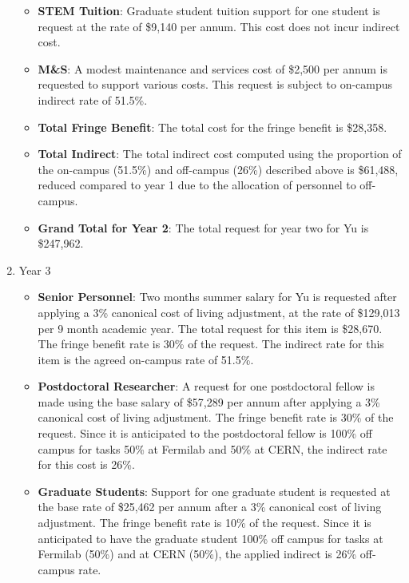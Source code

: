 \begin{enumerate}
\begin{itemize}[noitemsep,nolistsep]
\item {{\bf STEM Tuition}: Graduate student tuition support for one student is request at the rate of \$9,140 per annum.  This cost does not incur indirect cost.}

\item {{\bf M\&S}: A modest maintenance and services cost of \$2,500 per annum is requested to support various costs.   This request is subject to on-campus indirect rate of 51.5\%.}

\item {{\bf Total Fringe Benefit}: The total cost for the fringe benefit is \$28,358.}

\item {{\bf Total Indirect}: The total indirect cost computed using the proportion of the on-campus (51.5\%) and off-campus (26\%) described above is \$61,488, reduced compared to year 1 due to the allocation of personnel to off-campus.}

\item {{\bf Grand Total for Year 2}: The total request for year two for Yu is \$247,962.}

\end{itemize}

\item{Year 3}
\begin{itemize}[noitemsep,nolistsep]
\item{{\bf Senior Personnel}: Two months summer salary for Yu is requested after applying a 3\% canonical cost of living adjustment, at the rate of \$129,013 per 9 month academic year.  The total request for this item is \$28,670.   The fringe benefit rate is 30\% of the request.  The indirect rate for this item is the agreed on-campus rate of 51.5\%.}

\item {{\bf Postdoctoral Researcher}: A request for one postdoctoral fellow is made using the base salary of \$57,289 per annum after applying a 3\% canonical cost of living adjustment.  The fringe benefit rate is 30\% of the request.  Since it is anticipated to the postdoctoral fellow is 100\% off campus for tasks 50\% at Fermilab and 50\% at CERN, the indirect rate for this cost is 26\%.} 

\item{{\bf Graduate Students}: Support for one graduate student is requested at the base rate of \$25,462 per annum after a 3\% canonical cost of living adjustment.   The fringe benefit rate is 10\% of the request.  Since it is anticipated to have the graduate student 100\% off campus for tasks at Fermilab (50\%) and at CERN (50\%), the applied indirect is 26\% off-campus rate.}


\end{itemize}
\end{enumerate}
